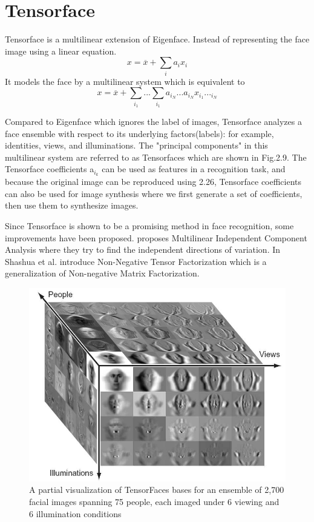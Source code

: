 \documentclass[12pt, twoside]{report}
\begin{document}
	\section {Tensorface}
	Tensorface \cite{90} is a multilinear extension of Eigenface. Instead of representing the face image using a linear equation.
	\begin{equation}
	x=\overline{x}+\sum_{i}a_i x_i
	\end{equation}
	It models the face by a multilinear system which is equivalent to
	\begin{equation}
	x=\overline{x}+\sum_{i_1}...\sum_{i_1}a_{i_N}...a_{i_N} x_{i_1}..._{i_N}
	\end{equation}
	\par 
	Compared to Eigenface which ignores the label of images, Tensorface analyzes a face ensemble with respect to its underlying factors(labels): for example, identities, views, and illuminations. The "principal components" in this multilinear system are referred to as Tensorfaces which are shown in Fig.2.9. The Tensorface coefficients a$_{i_k}$ can be used as features in a recognition task, and because the original image can be reproduced using 2.26, Tensorface coefficients can also be used for image synthesis where we first generate a set of coefficients, then use them to synthesize images.

	\newpage

	\par
	Since Tensorface is shown to be a promising method in face recognition, some improvements have been proposed. \cite{92} proposes Multilinear Independent Component Analysis where they try to find the independent directions of variation. In \cite{76} Shashua et al. introduce Non-Negative Tensor Factorization which is a generalization of Non-negative Matrix Factorization.
	\par 
	\begin{figure}
	\includegraphics[width=\textwidth]{img/20_1.png}
	\caption{A partial visualization of TensorFaces bases for an ensemble of 2,700 facial images spanning 75 people, each imaged under 6 viewing and 6 illumination conditions \cite{92}}
	\label{Fig 2.9}
	\end{figure}
\end{document}
